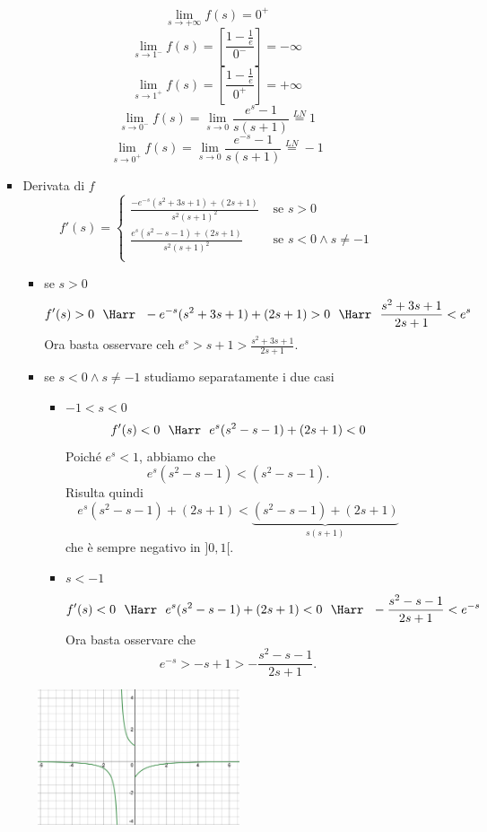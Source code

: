 \documentclass{article}
\newcommand{\se}{\text{ se }}
\begin{document}
\begin{enumerate}[label=\textbf{Esercizio 12.\arabic*.},itemindent=*]
\begin{enumerate}
\begin{itemize}
        \[\lim_{s\to +\infty}f(s)=0^+\]
        \[\lim_{s\to1^-}f(s)=\left[ \frac{1-\frac{1}{e}}{0^-} \right]=-\infty\]
        \[\lim_{s\to1^+}f(s)=\left[ \frac{1-\frac{1}{e}}{0^+} \right]=+\infty\]
        \[\lim_{s\to0^-}f(s)=\lim_{s\to 0}\frac{e^s-1}{s(s+1)}\stackrel{LN}{=}1\]
        \[\lim_{s\to0^+}f(s)=\lim_{s\to 0}\frac{e^{-s}-1}{s(s+1)}\stackrel{LN}{=}-1\]
        \item Derivata di $f$
        \[f'(s)=\begin{cases}
            \frac{-e^{-s}(s^2+3s+1)+(2s+1)}{s^2(s+1)^2}&\se s>0\\
            \frac{e^{s}(s^2-s-1)+(2s+1)}{s^2(s+1)^2}&\se s<0 \land s \neq - 1\\
        \end{cases}\]
        \begin{itemize}
            \item se $s>0$
            \[f'(s) >0~~\Harr~~-e^{-s}(s^2+3s+1)+(2s+1)>0~~\Harr~~\frac{s^2+3s+1}{2s+1}<e^s\]
            Ora basta osservare ceh $e^s>s+1>\frac{s^2+3s+1}{2s+1}$.
            \item se $s<0 \land s\neq -1$ studiamo separatamente i due casi
            \begin{itemize}
                \item $-1<s<0$
                \[f'(s)<0~~\Harr~~e^s(s^2-s-1)+(2s+1)<0\]
                Poiché $e^s<1$, abbiamo che   \[e^s(s^2-s-1)<(s^2-s-1).\]Risulta quindi \[e^s(s^2-s-1)+(2s+1)<\underbrace{(s^2-s-1)+(2s+1)}_{s(s +1)}\]
                che è sempre negativo in $]0,1[$.
                \item $s<-1$
                \[f'(s)<0~~\Harr~~e^{s}(s^2-s-1)+(2s+1)<0~~\Harr~~-\frac{s^2-s-1}{2s+1}<e^{-s}\]
            Ora basta osservare che 
                \[e^{ - s} >- s + 1 > - \frac{s^2 - s - 1}{2s + 1}.\]
            \end{itemize}
        \end{itemize}
    \end{itemize}

    \begin{figure}[ht]
        \centering
        \includegraphics[width=0.6\textwidth]{src/disegno1.png}
        \caption{}
        \label{fig:1.1}
    \end{figure}


\end{enumerate}
\end{enumerate}
\end{document}
